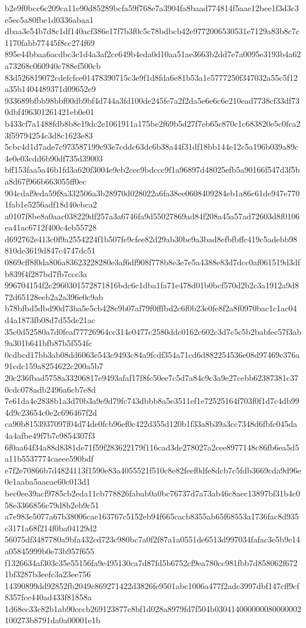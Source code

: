 {b2e9f0bcc6c209ca11e90d85289bcfa59f768e7a3904fa8baad774814f5aae12bee1f3d3c3e5ec5a80fbe1d0336abaa1
dbaa3e54b7d8c1df140acf386e17f7b3f0c5c78bdbcb42e9772006530531e7129a83b8c7c1170fabb77445f8cc274f69
895e44bbaa6acdbc3c1d4a3af2ce649b4eda0d10aa51ae3663b2dd7e7a0095e3193b4a62a73268c060940c788ef500cb
83d526819072cdefcfce01478390715c3e9f1d8fda6e81b53a1e5777250f347032a55c5f12a35b1404489371d09652e9
933689bfbb98bbf00db9bf4d744a3fd100de245fe7a2f2da5e6e6c6e210ead7738cf33df730dbf496301261421eb0e01
b433cf7a1488fdb8b8e19dc2e1061911a175be2f69b5d27f7eb65c870c1c683820e5c0fca23f59794254c3d8c1623e83
5cbc4d1d7ade7c973587199c93e7cddc63dc6b38a44f31df18bb144e12c5a196b039a89c4e0e03cdd6b90df735d39003
bff153faa5a46b1fd3a620f3004e9eb2cec9bdccc9f1a96897d48025efb5a90166f547d3f5ba8d67f966b663055ff0ec
904cdaf9eda59f8a332506a3b28970d028022a6fa38ee0608409284eb1a86c61de947e7701fab1e5256adf18d40ebca2
a0107f8be8a0aac038229df257a3a6746fa9d55027869ad84f208a45a57ad72603d8f0106ea41ac6712f400c4eb55728
d692762e413c0f9a2554224f1b507fe9cfee82d29ab30be9a3bad8efbfbffc419c5adebb98810de3619d847c4747dc51
0869cff8f0da806a83623228280e3af6df908f778b8e3e7e5a4388e83d7dcc0af061519d3dfb839f4f287bd7fb7ccc3a
996704154f2c2960301572871816bdc6c1dba1fa71e478d01b0bcf570d2b2c3a1912a9d872d65128eeb2a2a396e0c9ab
b78bfbd5dbd90d73ba5e5cb428c9b07af79f0fffbd2c6f0b23e0fe8f2a8f0970bac1c1ac04d4a1873fb08d7d55de21ac
35c0d52580a7d0feaf77726964cc314e0477c2580ddc0162c602c3d7c5c5b2babfec57f3ab9a301b641bfb87b5f554fc
0cdbcd17bb3ab08dd6063e543c9493c84a9fcdf354a71cd6d882254536e08d97469c376a91cdc159a8254622c200a5b7
20c236fbad5758a33206817e9493afaf17f8fc50ee7c5d7a84c9c3a9e27cebb62387381c370cdc078adb2496a6cb7e8d
7e61da4e2838b1a3d70b3a9e9d79fc743dbbb8a5e3511ef1e72525164f703f0f1d7c4db994d9c23654c0e2c696467f2d
ca90b8153937097f04d74de0fcb96ef0c422d355d120b1f33a8b39a3cc7348d6fbfc045da4a4afbe49f7b7e9854307f3
6f0aa64f34a88d8381de71f59f283622179f116cad3de278027a2cee8977148c86fb6ea5d5a11b5537774caeee590bdf
e7f2e70866b7d4824113f1590e83a4055521f510c8e82feef0dfe8dcb7c5fdb3669cda9d96e0e1aaba5aaeae60c013d1
bec0ee39acf9785cb2eda11cb778826fabab0a0bc76737d7a73ab46c8aec13897bf31b4c058e3366856c79d8b2eb9c51
a7e983e5077a67b38006cae163767c5152eb94f665cacb8355ab65f68553a1736fac8d935c3171a68f214f0ba04129d2
56075df3487780a9bfa432cd723c980bc7a0f2f87a1a0551de6513d997034fafac3e5b9e14a05845999b0e73b957f655
f1326634af303c35e55156fa9e495130ca7d87fd5b6752cf9ea780cc981fbb7d858062f6721bf3287b3eefc3a23ee756
14390899dd92852fb2049c869271422d3826fe9501abc1006a477f2adc3997dbf147cff9cf8357fce440ad433f81858a
1d68ec33c82b1ab90cccb269123877c8bf1d028a8979fd7f504b030414000000080000002100273b8791da0a00001e1b
}
